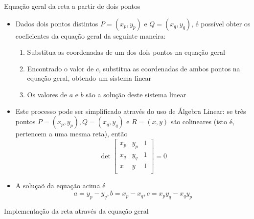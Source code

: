 \begin{frame}[fragile]{Equação geral da reta a partir de dois pontos}

    \begin{itemize}
        \item Dados dois pontos distintos $P = (x_p, y_p)$ e $Q = (x_q, y_q)$, é possível obter os 
        coeficientes da equação geral da seguinte maneira:

        \begin{enumerate}
            \item Substitua as coordenadas de um dos dois pontos na equação geral
            \item Encontrado o valor de $c$, substitua as coordenadas de ambos pontos na equação
            geral, obtendo um sistema linear
            \item Os valores de $a$ e $b$ são a solução deste sistema linear
        \end{enumerate}

        \item Este processo pode ser simplificado através do uso de Álgebra Linear: se três pontos 
        $P = (x_p, y_p), Q = (x_q, y_q)$ e $R = (x, y)$ são colineares 
        (isto é, pertencem a uma mesma reta), então
        \[
            \det \begin{bmatrix}
                x_p & y_p  & 1 \\
                x_q & y_q  & 1 \\
                x & y  & 1 \\
            \end{bmatrix} = 0
        \]

        \item A soluçaõ da equação acima é
        \[
            a = y_p - y_q, b = x_p - x_q, c = x_py_q - x_qy_p
        \]
    \end{itemize}
\end{frame}

\begin{frame}[fragile]{Implementação da reta através da equação geral}
\end{frame}

